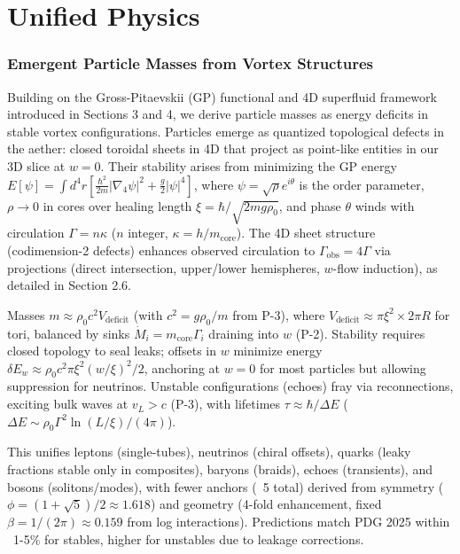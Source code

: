 \documentclass{article}
\begin{document}
\part{Unified Physics}

\section{Emergent Particle Masses from Vortex Structures}

Building on the Gross-Pitaevskii (GP) functional and 4D superfluid framework introduced in Sections 3 and 4, we derive particle masses as energy deficits in stable vortex configurations. Particles emerge as quantized topological defects in the aether: closed toroidal sheets in 4D that project as point-like entities in our 3D slice at $w=0$. Their stability arises from minimizing the GP energy $E[\psi] = \int d^4 r \left[ \frac{\hbar^2}{2 m} |\nabla_4 \psi|^2 + \frac{g}{2} |\psi|^4 \right]$, where $\psi = \sqrt{\rho} e^{i \theta}$ is the order parameter, $\rho \to 0$ in cores over healing length $\xi = \hbar / \sqrt{2 m g \rho_0}$, and phase $\theta$ winds with circulation $\Gamma = n \kappa$ ($n$ integer, $\kappa = h / m_{\text{core}}$). The 4D sheet structure (codimension-2 defects) enhances observed circulation to $\Gamma_{\text{obs}} = 4\Gamma$ via projections (direct intersection, upper/lower hemispheres, $w$-flow induction), as detailed in Section 2.6.

Masses $m \approx \rho_0 c^2 V_{\text{deficit}}$ (with $c^2 = g \rho_0 / m$ from P-3), where $V_{\text{deficit}} \approx \pi \xi^2 \times 2\pi R$ for tori, balanced by sinks $\dot{M}_i = m_{\text{core}} \Gamma_i$ draining into $w$ (P-2). Stability requires closed topology to seal leaks; offsets in $w$ minimize energy $\delta E_w \approx \rho_0 c^2 \pi \xi^2 (w / \xi)^2 / 2$, anchoring at $w=0$ for most particles but allowing suppression for neutrinos. Unstable configurations (echoes) fray via reconnections, exciting bulk waves at $v_L > c$ (P-3), with lifetimes $\tau \approx \hbar / \Delta E$ ($\Delta E \sim \rho_0 \Gamma^2 \ln(L / \xi) / (4\pi)$).

This unifies leptons (single-tubes), neutrinos (chiral offsets), quarks (leaky fractions stable only in composites), baryons (braids), echoes (transients), and bosons (solitons/modes), with fewer anchors (~5 total) derived from symmetry ($\phi = (1 + \sqrt{5})/2 \approx 1.618$) and geometry (4-fold enhancement, fixed $\beta = 1/(2\pi) \approx 0.159$ from log interactions). Predictions match PDG 2025 within ~1-5\% for stables, higher for unstables due to leakage corrections.
\end{document}

